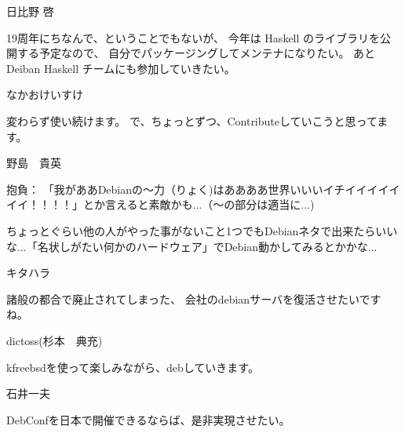 %

\begin{prework}{ 日比野 啓 }

19周年にちなんで、ということでもないが、
今年は Haskell のライブラリを公開する予定なので、
自分でパッケージングしてメンテナになりたい。
あと Deiban Haskell チームにも参加していきたい。

\end{prework}

\begin{prework}{ なかおけいすけ }

変わらず使い続けます。
で、ちょっとずつ、Contributeしていこうと思ってます。
\end{prework}

\begin{prework}{ 野島　貴英 }

抱負：
「我がああDebianの～力（りょく)はああああ世界いいいイチイイイイイイイ！！！！」とか言えると素敵かも...（～の部分は適当に...)
 
ちょっとぐらい他の人がやった事がないこと1つでもDebianネタで出来たらいいな...「名状しがたい何かのハードウェア」でDebian動かしてみるとかかな...

\end{prework}

\begin{prework}{ キタハラ }

諸般の都合で廃止されてしまった、
会社のdebianサーバを復活させたいですね。

\end{prework}

\begin{prework}{ dictoss(杉本　典充) }

kfreebsdを使って楽しみながら、debしていきます。
\end{prework}

\begin{prework}{ 石井一夫 }

DebConfを日本で開催できるならば、是非実現させたい。
\end{prework}
